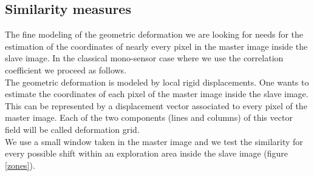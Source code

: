 

\subsection{Similarity measures\label{sec-simil}}


The fine modeling of the geometric deformation we are looking for
needs for the estimation of the coordinates of nearly every pixel in
the master image inside the slave image. In the classical mono-sensor
case where we use the correlation coefficient we proceed as follows.\\

The geometric deformation is modeled by local rigid displacements. One
wants to estimate the coordinates of each pixel of the master image inside the
slave image. This can be represented by a displacement vector
associated to every pixel of the master image. Each of the two components
(lines and columns) of this vector field will be called deformation grid.\\

We use a small window taken in the master image and we test the similarity
for every possible shift within an exploration area inside the slave
image (figure \ref{zones}). \\

